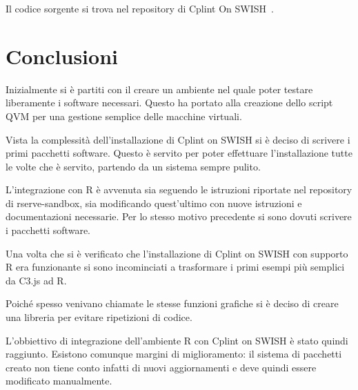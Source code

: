 \documentclass[10pt,titlepage,twoside,a4paper]{report}
\begin{document}
Il codice sorgente si trova nel repository di Cplint On 
SWISH~\cite{sevenScientistsRpl}.




\chapter{Conclusioni}
Inizialmente si è partiti con il creare un ambiente nel quale poter testare 
liberamente i software necessari. Questo ha portato alla creazione dello 
script QVM per una gestione semplice delle macchine virtuali.

Vista la complessità dell'installazione di Cplint on SWISH si è 
deciso di scrivere i primi pacchetti software.
Questo è servito per poter effettuare l'installazione tutte le volte che è
servito, partendo da un sistema sempre pulito.

L'integrazione con R è avvenuta sia seguendo le istruzioni riportate nel 
repository di rserve-sandbox, sia modificando quest'ultimo con nuove istruzioni 
e documentazioni necessarie. Per lo stesso motivo precedente si sono dovuti 
scrivere i pacchetti software.

Una volta che si è verificato che l'installazione di Cplint on SWISH con 
supporto R era funzionante si sono incominciati a trasformare i primi esempi 
più semplici da C3.js ad R. 

Poiché spesso venivano chiamate le stesse funzioni grafiche si è deciso di 
creare una libreria per evitare ripetizioni di codice.

L'obbiettivo di integrazione dell'ambiente R con Cplint on SWISH è stato 
quindi raggiunto. Esistono comunque margini di miglioramento: il sistema di 
pacchetti creato non tiene conto infatti di nuovi aggiornamenti e deve quindi
essere modificato manualmente.




\printbibliography
\end{document}
